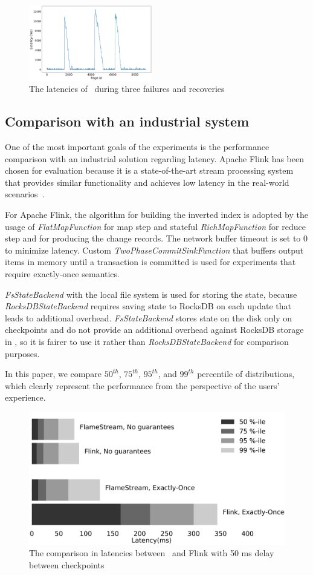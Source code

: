 \begin{figure}[htbp]
  \centering
  \includegraphics[width=0.48\textwidth]{pics/blink}
  \caption{The latencies of \FlameStream\ during three failures and recoveries}
  \label {recovery}
\end{figure}

\subsection{Comparison with an industrial system}
One of the most important goals of the experiments is the performance comparison with an industrial solution regarding latency. Apache Flink has been chosen for evaluation because it is a state-of-the-art stream processing system that provides similar functionality and achieves low latency in the real-world scenarios~\cite{S7530084}. 

For Apache Flink, the algorithm for building the inverted index is adopted by the usage of {\it FlatMapFunction} for map step and stateful {\it RichMapFunction} for reduce step and for producing the change records. The network buffer timeout is set to 0 to minimize latency. Custom {\it TwoPhaseCommitSinkFunction} that buffers output items in memory until a transaction is committed is used for experiments that require exactly-once semantics. 

{\it FsStateBackend} with the local file system is used for storing the state, because {\it RocksDBStateBackend} requires saving state to RocksDB on each update that leads to additional overhead. {\it FsStateBackend} stores state on the disk only on checkpoints and do not provide an additional overhead against RocksDB storage in \FlameStream, so it is fairer to use it rather than {\it RocksDBStateBackend} for comparison purposes.

In this paper, we compare $50^{th}$, $75^{th}$, $95^{th}$, and $99^{th}$ percentile of distributions, which clearly represent the performance from the perspective of the users' experience.

\begin{figure}[htbp]
  \centering
  \includegraphics[width=.5\textwidth]{pics/comparison50}
  \caption{The comparison in latencies between \FlameStream\ and Flink with 50 ms delay between checkpoints}
  \label {comparison50}
\end{figure}

